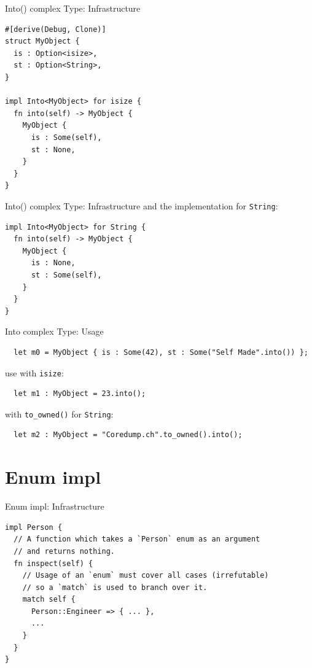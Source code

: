 \documentclass[aspectratio=1610,t]{beamer}
\begin{document}
\begin{frame}[fragile]{Into() complex Type: Infrastructure}
\begin{verbatim}
#[derive(Debug, Clone)]
struct MyObject {
  is : Option<isize>,
  st : Option<String>,
}

impl Into<MyObject> for isize {
  fn into(self) -> MyObject {
    MyObject {
      is : Some(self),
      st : None,
    }
  }
}
\end{verbatim}
\end{frame}

\begin{frame}[fragile]{Into() complex Type: Infrastructure}
and the implementation for \texttt{String}:
\begin{verbatim}
impl Into<MyObject> for String {
  fn into(self) -> MyObject {
    MyObject {
      is : None,
      st : Some(self),
    }
  }
}
\end{verbatim}
\end{frame}


\begin{frame}[fragile]{Into\(\) complex Type: Usage}
  \begin{verbatim}
  let m0 = MyObject { is : Some(42), st : Some("Self Made".into()) };
  \end{verbatim}

\pause

  use with \texttt{isize}:
  \begin{verbatim}
  let m1 : MyObject = 23.into();
  \end{verbatim}

\pause

  with \texttt{to\_owned()} for \texttt{String}:
  \begin{verbatim}
  let m2 : MyObject = "Coredump.ch".to_owned().into();
  \end{verbatim}
\end{frame}




{
\section{Enum impl}
}

\begin{frame}[fragile]{Enum impl: Infrastructure}
\begin{verbatim}
impl Person {
  // A function which takes a `Person` enum as an argument
  // and returns nothing.
  fn inspect(self) {
    // Usage of an `enum` must cover all cases (irrefutable)
    // so a `match` is used to branch over it.
    match self {
      Person::Engineer => { ... },
      ...
    }
  }
}
\end{verbatim}
\end{frame}
\end{document}
